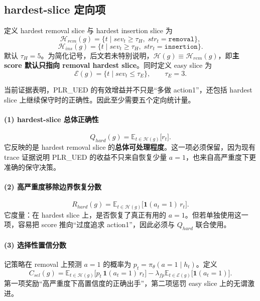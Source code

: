 \documentclass[11pt,a4paper]{ctexart}
\newcommand{\E}{\mathbb{E}}
\newcommand{\I}{\mathbf{1}}
\begin{document}
\subsection{hardest-slice 定向项}
定义 hardest removal slice 与 hardest insertion slice 为
\begin{equation}
\mathcal{H}_{rem}(g)=\{t\mid sev_t\ge \tau_H,\; str_t=\texttt{removal}\},
\label{eq:hard_slice}
\end{equation}
\begin{equation}
\mathcal{H}_{ins}(g)=\{t\mid sev_t\ge \tau_H,\; str_t=\texttt{insertion}\}.
\label{eq:hard_slice_ins}
\end{equation}
默认 \(\tau_H=5\)。为简化记号，后文若未特别说明，\(\mathcal{H}(g)\equiv \mathcal{H}_{rem}(g)\)，即\textbf{主 score 默认只指向 removal hardest slice}。同时定义 easy slice 为
\begin{equation}
\mathcal{E}(g)=\{t\mid sev_t\le \tau_E\},\qquad \tau_E=3.
\label{eq:easy_slice}
\end{equation}

当前证据表明，PLR\_UED 的有效增益并不只是“多做 action1”，还包括 hardest slice 上继续保守时的正确性。因此至少需要五个定向统计量。

\paragraph{(1) hardest-slice 总体正确性}
\begin{equation}
Q_{hard}(g)=\E_{t\in \mathcal{H}(g)}\big[r_t\big].
\label{eq:Qhard}
\end{equation}
它反映的是 hardest removal slice 的\textbf{总体可处理程度}。这一项必须保留，因为现有 trace 证据说明 PLR\_UED 的收益不只来自恢复少量 \(a=1\)，也来自高严重度下更准确的保守决策。

\paragraph{(2) 高严重度移除边界恢复分数}
\begin{equation}
R_{hard}(g)=\E_{t\in \mathcal{H}(g)}\big[\I(a_t=1)\,r_t\big].
\label{eq:Rhard}
\end{equation}
它度量：在 hardest slice 上，是否恢复了真正有用的 \(a=1\)。但若单独使用这一项，容易把 score 推向“过度追求 action1”，因此必须与 \(Q_{hard}\) 联合使用。

\paragraph{(3) 选择性置信分数}
记策略在 removal 上预测 \(a=1\) 的概率为 \(p_t=\pi_\theta(a=1\mid h_t)\)。定义
\begin{equation}
C_{sel}(g)=\E_{t\in \mathcal{H}(g)}\big[p_t\,\I(a_t=1)\,r_t\big]-\lambda_{fp}\E_{t\in \mathcal{E}(g)}\big[\I(a_t=1)\big].
\label{eq:csel}
\end{equation}
第一项奖励“高严重度下高置信度的正确出手”，第二项惩罚 easy slice 上的无谓激进。
\end{document}
